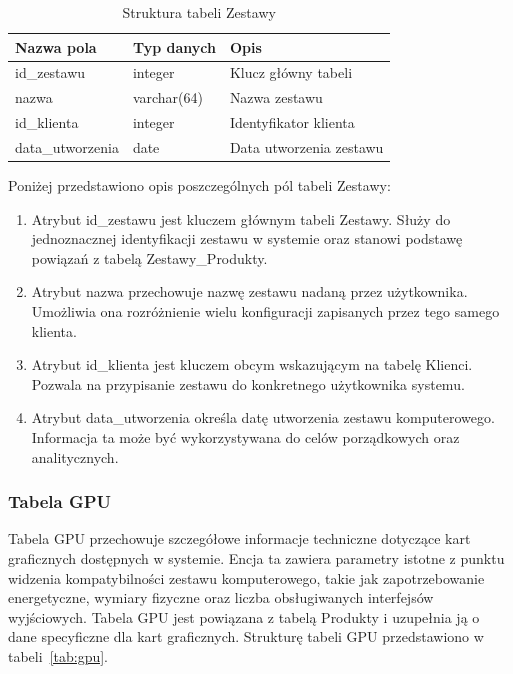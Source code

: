 \documentclass[a4paper,twoside,12pt]{book}
\begin{document}
\begin{table}[H]
\centering
\caption{Struktura tabeli Zestawy}
\label{tab:zestawy}
\begin{tabular}{lll}
\hline
Nazwa pola & Typ danych & Opis \\ \hline
id\_zestawu & integer & Klucz główny tabeli \\
nazwa & varchar(64) & Nazwa zestawu \\
id\_klienta & integer & Identyfikator klienta \\
data\_utworzenia & date & Data utworzenia zestawu \\ \hline
\end{tabular}
\end{table}


Poniżej przedstawiono opis poszczególnych pól tabeli Zestawy:

\begin{enumerate}
    \item Atrybut id\_zestawu jest kluczem głównym tabeli Zestawy. Służy do
    jednoznacznej identyfikacji zestawu w systemie oraz stanowi podstawę
    powiązań z tabelą Zestawy\_Produkty.

    \item Atrybut nazwa przechowuje nazwę zestawu nadaną przez użytkownika.
    Umożliwia ona rozróżnienie wielu konfiguracji zapisanych przez tego samego
    klienta.

    \item Atrybut id\_klienta jest kluczem obcym wskazującym na tabelę Klienci.
    Pozwala na przypisanie zestawu do konkretnego użytkownika systemu.

    \item Atrybut data\_utworzenia określa datę utworzenia zestawu
    komputerowego. Informacja ta może być wykorzystywana do celów
    porządkowych oraz analitycznych.
\end{enumerate}

\newpage 
\subsubsection{Tabela GPU}
Tabela GPU przechowuje szczegółowe informacje techniczne dotyczące kart
graficznych dostępnych w systemie. Encja ta zawiera parametry istotne z punktu
widzenia kompatybilności zestawu komputerowego, takie jak zapotrzebowanie
energetyczne, wymiary fizyczne oraz liczba obsługiwanych interfejsów wyjściowych.
Tabela GPU jest powiązana z tabelą Produkty i uzupełnia ją o dane specyficzne dla
kart graficznych. Strukturę tabeli GPU przedstawiono w tabeli~\ref{tab:gpu}.
\end{document}

